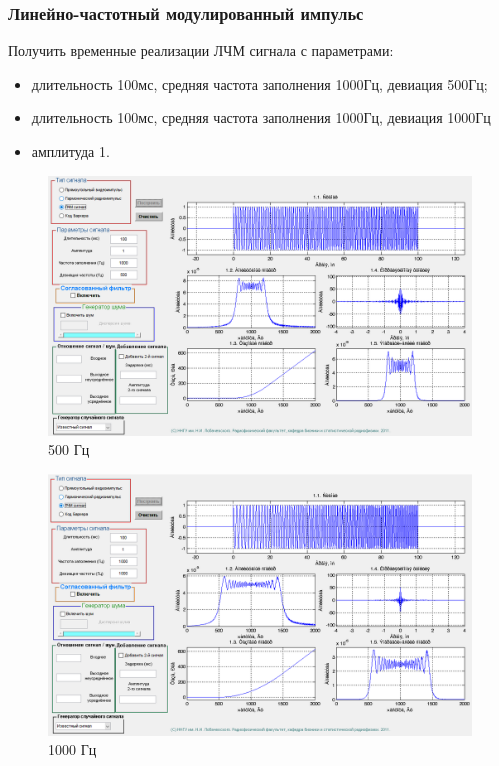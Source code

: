 \subsubsection{Линейно-частотный модулированный импульс}
Получить временные реализации ЛЧМ сигнала с параметрами:
\begin{itemize}
    \item длительность 100мс, средняя частота заполнения 1000Гц,
    девиация 500Гц;
    \item длительность 100мс, средняя частота заполнения 1000Гц,
    девиация 1000Гц
    \item амплитуда 1.
\end{itemize}
\begin{figure}[H]
    \centering
    \includegraphics[width=0.9\linewidth]{imgs/t1s3_500.png}
    \caption{500 Гц}
    \label{fig:task3_500}
\end{figure}
\begin{figure}[H]
    \centering
    \includegraphics[width=0.9\linewidth]{imgs/t1s3_1000.png}
    \caption{1000 Гц}
    \label{fig:task3_1000}
\end{figure}

